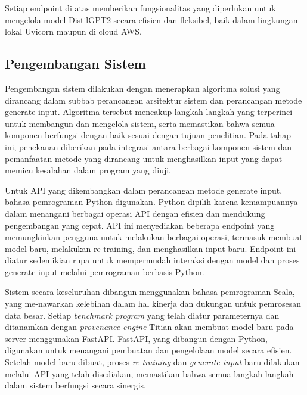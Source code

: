 Setiap endpoint di atas memberikan fungsionalitas yang diperlukan untuk 
mengelola model DistilGPT2 secara efisien dan fleksibel, baik dalam lingkungan 
lokal Uvicorn maupun di cloud AWS.
  
  \subsection{Pengembangan Sistem}
  \label{subsec:pengembangansistem}
  Pengembangan sistem dilakukan dengan menerapkan algoritma solusi yang dirancang dalam subbab perancangan arsitektur sistem dan perancangan metode generate input. Algoritma tersebut mencakup langkah-langkah yang terperinci untuk membangun dan mengelola sistem, serta memastikan bahwa semua komponen berfungsi dengan baik sesuai dengan tujuan penelitian. Pada tahap ini, penekanan diberikan pada integrasi antara berbagai komponen sistem dan pemanfaatan metode yang dirancang untuk menghasilkan input yang dapat memicu kesalahan dalam program yang diuji.

  Untuk API yang dikembangkan dalam perancangan metode generate input, bahasa pemrograman Python digunakan. Python dipilih karena kemampuannya dalam menangani berbagai operasi API dengan efisien dan mendukung pengembangan yang cepat. API ini menyediakan beberapa endpoint yang memungkinkan pengguna untuk melakukan berbagai operasi, termasuk membuat model baru, melakukan re-training, dan menghasilkan input baru. Endpoint ini diatur sedemikian rupa untuk mempermudah interaksi dengan model dan proses generate input melalui pemrograman berbasis Python.

  Sistem secara keseluruhan dibangun menggunakan bahasa pemrograman Scala, yang me-nawarkan kelebihan dalam hal kinerja dan dukungan untuk pemrosesan data besar. Setiap \emph{benchmark program} yang telah diatur parameternya dan ditanamkan dengan \emph{provenance engine} Titian akan membuat model baru pada server menggunakan FastAPI. FastAPI, yang dibangun dengan Python, digunakan untuk menangani pembuatan dan pengelolaan model secara efisien. Setelah model baru dibuat, proses \emph{re-training} dan \emph{generate input} baru dilakukan melalui API yang telah disediakan, memastikan bahwa semua langkah-langkah dalam sistem berfungsi secara sinergis.

